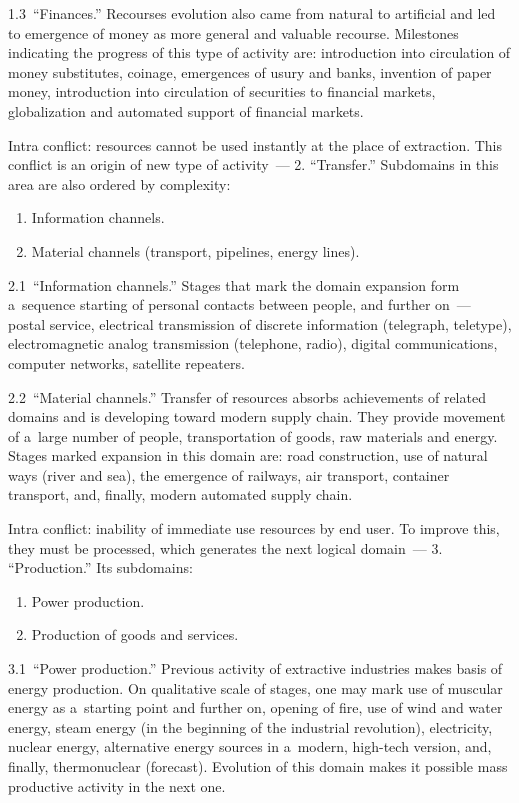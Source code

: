 \begin{multicols}{2}
 1.3\ ``Finances.'' Recourses evolution also came from natural to artificial and led to emergence of money
as more general and valuable recourse.  Milestones indicating the progress of this type of activity are:
introduction into circulation of money substitutes, coinage, emergences of usury and banks, invention of
paper money, introduction into circulation of securities to financial markets, globalization and automated
support of financial markets.

 Intra conflict: resources cannot be used instantly at the place of extraction. This conflict is an origin of
new type of activity~--- 2. ``Transfer.''  Subdomains in this area are also ordered by complexity:
 \begin{enumerate}[{2}.1]
 \item  Information channels.
 \item  Material channels (transport, pipelines, energy lines).
 \end{enumerate}

 2.1\ ``Information channels.''  Stages that mark the domain expansion
 form a~sequence starting of
personal contacts between people, and further on~--- postal service, electrical transmission of discrete
information (telegraph, teletype), electromagnetic analog transmission (telephone, radio), digital
communications, computer  networks, satellite repeaters.

 2.2\ ``Material channels.''  Transfer of resources absorbs achievements of related domains and is
developing toward modern supply chain. They provide movement of a~large number of people,
transportation of goods, raw materials and energy. Stages marked expansion in this domain are: road
construction, use of natural ways (river and sea), the emergence of railways, air transport, container
transport, and, finally, modern automated supply chain.

 Intra conflict: inability of immediate use resources by end user. To improve this, they must be processed,
which generates the next logical domain~--- 3. ``Production.''  Its subdomains:
 \begin{enumerate}[{3}.1]
 \item  Power production.
 \item Production of goods and services.
 \end{enumerate}

 3.1\ ``Power production.'' Previous activity of extractive industries makes basis of energy production. On
qualitative scale of stages, one may mark use of muscular energy as
a~starting point and further on, opening of
fire, use of wind  and water energy, steam energy (in the beginning of the industrial revolution),
electricity, nuclear energy, alternative energy sources in a~modern, high-tech version, and, finally,
thermonuclear (forecast). Evolution of this domain makes it possible mass productive activity in the next
one.


\end{multicols}
